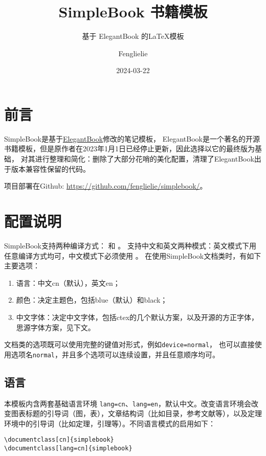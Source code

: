 \documentclass[lang=cn,10pt,cnfont=NotoCJK]{../simplebook}
\title{SimpleBook 书籍模板}
\subtitle{基于 ElegantBook 的\LaTeX{}模板}
\author{Fenglielie}
\date{2024-03-22}
\begin{document}
\maketitle

\frontmatter

\chapter*{前言}

SimpleBook是基于\href{https://github.com/ElegantLaTeX/ElegantBook}{ElegantBook}修改的笔记模板，
ElegantBook是一个著名的开源书籍模板，但是原作者在2023年1月1日已经停止更新，因此选择以它的最终版为基础，
对其进行整理和简化：删除了大部分花哨的美化配置，清理了ElegantBook出于版本兼容性保留的代码。

项目部署在Github: \href{https://github.com/fenglielie/simplebook/}{https://github.com/fenglielie/simplebook/}。


\tableofcontents

\mainmatter


\chapter{配置说明}

SimpleBook支持两种编译方式： 和 。
支持中文和英文两种模式：英文模式下用任意编译方式均可，中文模式下必须使用 。
在使用SimpleBook文档类时，有如下主要选项：

\begin{enumerate}
    \item 语言：中文cn（默认），英文en；
    \item 颜色：决定主题色，包括blue（默认）和black；
    \item 中文字体：决定中文字体，包括ctex的几个默认方案，以及开源的方正字体，思源字体方案，见下文。
\end{enumerate}


\begin{remark}
    文档类的选项既可以使用完整的键值对形式，例如\lstinline{device=normal}，
    也可以直接使用选项名\lstinline{normal}，并且多个选项可以连续设置，并且任意顺序均可。
\end{remark}


\section{语言}
本模板内含两套基础语言环境 \lstinline{lang=cn}、\lstinline{lang=en}，默认中文。改变语言环境会改变图表标题的引导词（图，表），文章结构词（比如目录，参考文献等），以及定理环境中的引导词（比如定理，引理等）。不同语言模式的启用如下：
\begin{lstlisting}
\documentclass[cn]{simplebook}
\documentclass[lang=cn]{simplebook}
\end{lstlisting}
\end{document}
